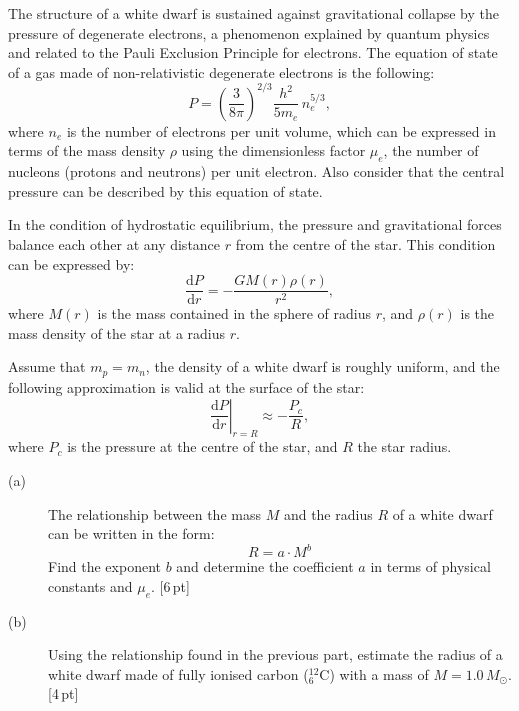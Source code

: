 The structure of a white dwarf is sustained against gravitational collapse by
the pressure of degenerate electrons, a phenomenon explained by quantum
physics and related to the Pauli Exclusion Principle for electrons. The
equation of state of a gas made of non-relativistic degenerate electrons is
the following:
\[ P = \left(\frac{3}{8\pi}\right)^{2/3}\frac{h^2}{5m_e}\,n_e^{5/3}, \]
where $n_e$ is the number of electrons per unit volume, which can be expressed
in terms of the mass density $\rho$ using the dimensionless factor $\mu_e$,
the number of nucleons (protons and neutrons) per unit electron. Also consider
that the central pressure can be described by this equation of state.

In the condition of hydrostatic equilibrium, the pressure and gravitational
forces balance each other at any distance $r$ from the centre of the star.
This condition can be expressed by:
\[ \frac{\mathrm{d}P}{\mathrm{d}r} = -\frac{GM(r)\rho(r)}{r^2}, \]
where $M(r)$ is the mass contained in the sphere of radius $r$, and $\rho(r)$
is the mass density of the star at a radius $r$.

Assume that $m_p = m_n$, the density of a white dwarf is roughly uniform, and
the following approximation is valid at the surface of the star:
\[ \left.\frac{\mathrm{d}P}{\mathrm{d}r}\right|_{r=R}
   \approx -\frac{P_c}{R}, \]
where $P_c$ is the pressure at the centre of the star, and $R$ the star
radius.

\begin{description}
\item[(a)] The relationship between the mass $M$ and the radius $R$ of a white
  dwarf can be written in the form:
  \[ R = a \cdot M^b \]
  Find the exponent $b$ and determine the coefficient $a$ in terms of physical
  constants and $\mu_e$. \hfill[6\,pt]
\item[(b)] Using the relationship found in the previous part, estimate the
  radius of a white dwarf made of fully ionised carbon
  ($^{12}_{6}\mathrm{C}$) with a mass of $M = 1.0\,M_\odot$. \hfill[4\,pt]
\end{description}
